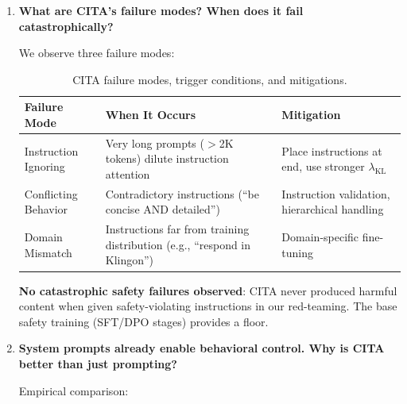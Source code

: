 \begin{enumerate}[label=\textbf{Q\arabic*.}, leftmargin=*, itemsep=8pt]
\item \textbf{What are CITA's failure modes? When does it fail catastrophically?}

 We observe three failure modes:

\begin{table}[ht!]
\centering
\normalsize
\renewcommand{\arraystretch}{1.2}
\begin{tabularx}{\textwidth}{@{}l>{\raggedright\arraybackslash}X>{\raggedright\arraybackslash}X@{}}
\toprule
\textbf{Failure Mode} & \textbf{When It Occurs} & \textbf{Mitigation} \\
\midrule
Instruction Ignoring & Very long prompts ($>$2K tokens) dilute instruction attention & Place instructions at end, use stronger $\lambda_{\text{KL}}$ \\ \hline
Conflicting Behavior & Contradictory instructions (``be concise AND detailed'') & Instruction validation, hierarchical handling \\ \hline
Domain Mismatch & Instructions far from training distribution (e.g., ``respond in Klingon'') & Domain-specific fine-tuning \\
\bottomrule
\end{tabularx}
\caption{CITA failure modes, trigger conditions, and mitigations.}
\label{tab:faq_failure_modes}
\end{table}

\textbf{No catastrophic safety failures observed}: CITA never produced harmful content when given safety-violating instructions in our red-teaming. The base safety training (SFT/DPO stages) provides a floor.

\vspace{4mm}

\item \textbf{System prompts already enable behavioral control. Why is CITA better than just prompting?}

 Empirical comparison:

\begin{table}[ht!]
\centering
\normalsize
\renewcommand{\arraystretch}{1.2}
\caption{CITA vs prompting baselines on ECLIPTICA and robustness.}
\label{tab:faq_cita_vs_prompting}
\end{table}


\end{enumerate}
